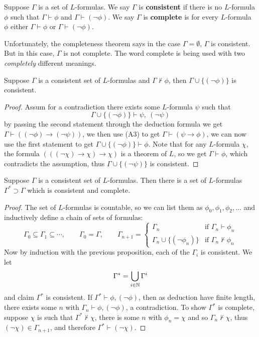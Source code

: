 \documentclass{article}
\begin{document}
\begin{definition}
    Suppose $\Gamma$ is a set of $L$-formulas. We say $\Gamma$ is \textbf{consistent} if there is no $L$-formula $\phi$ such that $\Gamma\vdash\phi$ and $\Gamma\vdash(\neg\phi)$. We say $\Gamma$ is \textbf{complete} is for every $L$-formula $\phi$ either $\Gamma\vdash\phi$ or $\Gamma\vdash(\neg\phi)$.
\end{definition}

Unfortunately, the completeness theorem says in the case $\Gamma=\emptyset$, $\Gamma$ is consistent. But in this case, $\Gamma$ is not complete. The word complete is being used with two \textit{completely} different meanings.

\begin{proposition}
    Suppose $\Gamma$ is a consistent set of $L$-formulas and $\Gamma\not\vdash\phi$, then $\Gamma\cup\{(\neg\phi)\}$ is consistent.
    \begin{proof}
        Assum for a contradiction there exists some $L$-formula $\psi$ such that \[
        \Gamma\cup\{(\neg\phi)\} \vdash \psi, \ (\neg\psi)
        \] by passing the second statement through the deduction formula we get $\Gamma\vdash ((\neg\phi)\rightarrow(\neg\psi))$, we then use (A3) to get $\Gamma\vdash (\psi\rightarrow\phi)$, we can now use the first statement to get $\Gamma\cup\{(\neg\phi)\} \vdash \phi$. Note that for any $L$-formula $\chi$, the formula $(((\neg\chi)\rightarrow\chi)\rightarrow\chi)$ is a theorem of $L$, so we get $\Gamma\vdash \phi$, which contradicts the assumption, thus $\Gamma\cup\{(\neg\psi)\}$ is consistent.
    \end{proof}
\end{proposition}

\begin{proposition}
    Suppose $\Gamma$ is a consistent set of $L$-formulas. Then there is a set of $L$-formulas $\Gamma^*\supset\Gamma$ which is consistent and complete.
    \begin{proof}
        The set of $L$-formulas is countable, so we can list them as $\phi_0,\phi_1,\phi_2,\ldots$ and inductively define a chain of sets of formulas: \[
        \Gamma_0\subseteq \Gamma_1\subseteq \cdots, \qquad \Gamma_0=\Gamma, \qquad \Gamma_{n+1} = \begin{cases}
            \Gamma_n & \text{if } \Gamma_n\vdash\phi_n\\
            \Gamma_n\cup\{(\neg\phi_n)\} & \text{if } \Gamma_n\not\vdash\phi_n
        \end{cases}
        \] Now by induction with the previous proposition, each of the $\Gamma_i$ is consistent. We let \[
        \Gamma^* = \bigcup_{i\in\mathbb{N}}\Gamma^i
        \] and claim $\Gamma^*$ is consistent. If $\Gamma^*\vdash\phi, (\neg\phi)$, then as deduction have finite length, there exists some $n$ with $\Gamma_n\vdash\phi,(\neg\phi)$, a contradiction. To show $\Gamma^*$ is complete, suppose $\chi$ is such that $\Gamma^*\not\vdash\chi$, there is some $n$ with $\phi_n=\chi$ and so $\Gamma_n\not\vdash\chi$, thus $(\neg\chi)\in\Gamma_{n+1}$, and therefore $\Gamma^*\vdash(\neg\chi)$.
    \end{proof}
\end{proposition}
\end{document}
